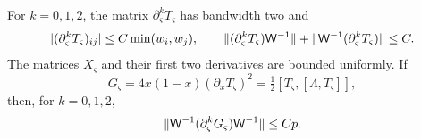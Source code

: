 \begin{lemma}\label{inf:angular-weighted}
For $k=0,1,2$, the matrix $\partial_\varsigma^kT_\varsigma$ has bandwidth two and
\begin{equation}\label{inf:T-entry-bound}
 |(\partial_\varsigma^kT_\varsigma)_{ij}|\le C\min(w_i,w_j),\qquad
 \lVert (\partial_\varsigma^kT_\varsigma)\mathsf W^{-1}\rVert+
 \lVert \mathsf W^{-1}(\partial_\varsigma^kT_\varsigma)\rVert\le C.
\end{equation}
The matrices $X_\varsigma$ and their first two derivatives are bounded uniformly.
If
\begin{equation}\label{inf:G-angular}
 G_\varsigma=4x(1-x)(\partial_xT_\varsigma)^2
     =\tfrac12[T_\varsigma,[\Lambda,T_\varsigma]],
\end{equation}
then, for $k=0,1,2$,
\begin{equation}\label{inf:G-weighted}
 \lVert \mathsf W^{-1}(\partial_\varsigma^kG_\varsigma)\mathsf W^{-1}\rVert\le Cp.
\end{equation}
\end{lemma}
